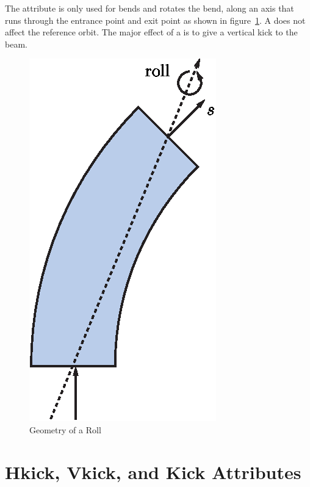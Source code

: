 The  attribute is only used for bends
and rotates the bend, along an axis that runs through the entrance
point and exit point as shown in figure~\ref{f:roll}. A  
does not affect the reference orbit. The major effect of a 
is to give a vertical kick to the beam.
\begin{figure}[ht]
  \centering
  \includegraphics{roll.eps}
  \caption{Geometry of a Roll}
  \label{f:roll}
\end{figure}


\section{Hkick, Vkick, and Kick Attributes}
\label{s:kick}


